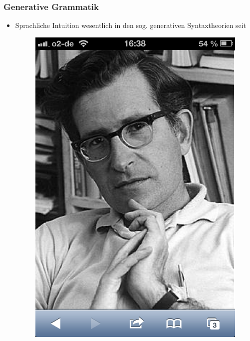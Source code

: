 \begin{frame}
\frametitle{Generative Grammatik}

\begin{itemize}

	\item Sprachliche Intuition \ras wesentlich in den sog. generativen Syntaxtheorien seit \citet{Chomsky57a}

\begin{figure}
\centering
	\includegraphics[scale=.17]{material/03chomsky}
\end{figure}

	
\end{itemize}

\end{frame}


